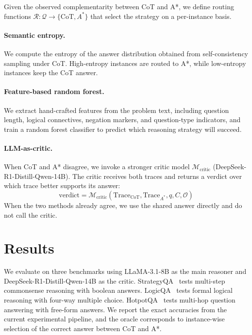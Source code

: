 \documentclass[11pt]{article}
\begin{document}
Given the observed complementarity between CoT and A*, we define routing functions $\mathcal{R}: \mathcal{Q} \to \{\text{CoT}, A^*\}$ that select the strategy on a per-instance basis.

\paragraph{Semantic entropy.}
We compute the entropy of the answer distribution obtained from self-consistency sampling under CoT. High-entropy instances are routed to A*, while low-entropy instances keep the CoT answer.

\paragraph{Feature-based random forest.}
We extract hand-crafted features from the problem text, including question length, logical connectives, negation markers, and question-type indicators, and train a random forest classifier to predict which reasoning strategy will succeed.

\paragraph{LLM-as-critic.}
When CoT and A* disagree, we invoke a stronger critic model $\mathcal{M}_{\text{critic}}$ (DeepSeek-R1-Distill-Qwen-14B). The critic receives both traces and returns a verdict over which trace better supports its answer:
\begin{equation}
\text{verdict} = \mathcal{M}_{\text{critic}}(\text{Trace}_{\text{CoT}}, \text{Trace}_{A^*}, q, C, \mathcal{O}) 
\label{eq:critic}
\end{equation}
When the two methods already agree, we use the shared answer directly and do not call the critic.

\section{Results}
\label{sec:results}

We evaluate on three benchmarks using LLaMA-3.1-8B as the main reasoner and DeepSeek-R1-Distill-Qwen-14B as the critic. StrategyQA~\cite{geva2021did} tests multi-step commonsense reasoning with boolean answers. LogicQA~\cite{liu2020logiqa} tests formal logical reasoning with four-way multiple choice. HotpotQA~\cite{yang2018hotpotqa} tests multi-hop question answering with free-form answers. We report the exact accuracies from the current experimental pipeline, and the oracle corresponds to instance-wise selection of the correct answer between CoT and A*.
\end{document}
